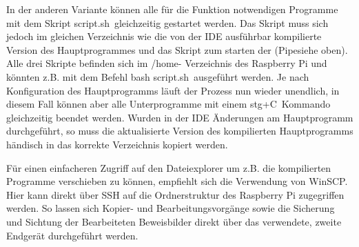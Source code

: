 In der anderen Variante können alle für die Funktion notwendigen Programme mit dem Skript \glqq script.sh\grqq\ gleichzeitig gestartet werden. Das Skript muss sich jedoch im gleichen Verzeichnis wie die von der IDE ausführbar kompilierte Version des Hauptprogrammes und das Skript zum starten der (Pipesiehe oben). Alle drei Skripte befinden sich im /home- Verzeichnis des Raspberry Pi und könnten z.B. mit dem Befehl \glqq bash script.sh\grqq\ ausgeführt werden. Je nach Konfiguration des Hauptprogramms läuft der Prozess nun wieder unendlich, in diesem Fall können aber alle Unterprogramme mit einem \glqq stg+C\grqq\ Kommando gleichzeitig beendet werden. Wurden in der IDE Änderungen am Hauptprogramm durchgeführt, so muss die aktualisierte Version des kompilierten Hauptprogramms händisch in das korrekte Verzeichnis kopiert werden. 

Für einen einfacheren Zugriff auf den Dateiexplorer um z.B. die kompilierten Programme verschieben zu können, empfiehlt sich die Verwendung von \glqq WinSCP\grqq. Hier kann direkt über SSH auf die Ordnerstruktur des Raspberry Pi zugegriffen werden. So lassen sich Kopier- und Bearbeitungsvorgänge sowie die Sicherung und Sichtung der Bearbeiteten Beweisbilder direkt über das verwendete, zweite Endgerät durchgeführt werden.
